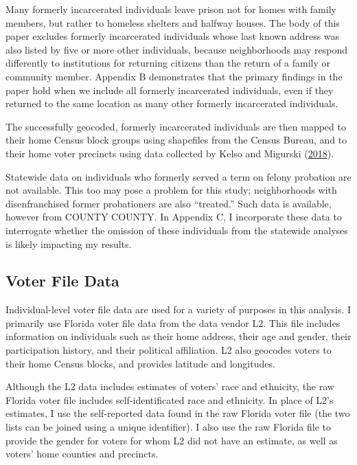 \documentclass[
  12pt,
]{article}
\begin{document}
Many formerly incarcerated individuals leave prison not for homes with family members, but rather to homeless shelters and halfway houses. The body of this paper excludes formerly incarcerated individuals whose last known address was also listed by five or more other individuals, because neighborhoods may respond differently to institutions for returning citizens than the return of a family or community member. Appendix B demonstrates that the primary findings in the paper hold when we include all formerly incarcerated individuals, even if they returned to the same location as many other formerly incarcerated individuals.

The successfully geocoded, formerly incarcerated individuals are then mapped to their home Census block groups using shapefiles from the Census Bureau, and to their home voter precincts using data collected by Kelso and Migurski (\protect\hyperlink{ref-Kelso2018}{2018}).

Statewide data on individuals who formerly served a term on felony probation are not available. This too may pose a problem for this study; neighborhoods with disenfranchised former probationers are also ``treated.'' Such data is available, however from COUNTY COUNTY. In Appendix C, I incorporate these data to interrogate whether the omission of these individuals from the statewide analyses is likely impacting my results.

\hypertarget{voter-file-data}{%
\subsection*{Voter File Data}\label{voter-file-data}}

Individual-level voter file data are used for a variety of purposes in this analysis. I primarily use Florida voter file data from the data vendor L2. This file includes information on individuals such as their home address, their age and gender, their participation history, and their political affiliation. L2 also geocodes voters to their home Census blocks, and provides latitude and longitudes.

Although the L2 data includes estimates of voters' race and ethnicity, the raw Florida voter file includes self-identificated race and ethnicity. In place of L2's estimates, I use the self-reported data found in the raw Florida voter file (the two lists can be joined using a unique identifier). I also use the raw Florida file to provide the gender for voters for whom L2 did not have an estimate, as well as voters' home counties and precincts.
\end{document}
